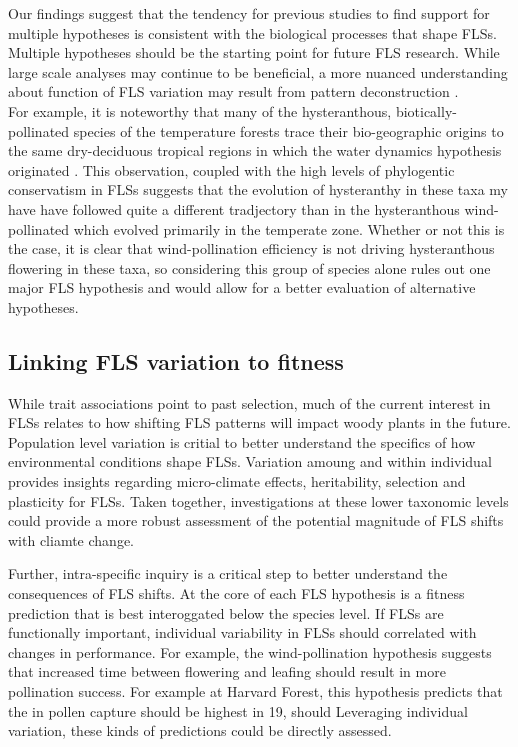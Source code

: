 \documentclass[11pt]{article}
\begin{document}
{\noindent Our findings suggest that the tendency for previous studies to find support for multiple hypotheses \citep{Bolmgren2003,Gougherty2018,Savage2019} is consistent with the biological processes that shape FLSs. Multiple hypotheses should be the starting point for future FLS research. While large scale analyses may continue to be beneficial, a more nuanced understanding about function of FLS variation may result from pattern deconstruction \citep[i.e. grouping of species according to trait commonalities or their geographic or phylogenetic distributions,][]{Terribile2009}.\\

\noindent For example, it is noteworthy that many of the hysteranthous, biotically-pollinated species of the temperature forests trace their bio-geographic origins to the same dry-deciduous tropical regions \citep{Daubenmire1972} in which the water dynamics hypothesis originated \citep{Janzen1967,Franklin2016}. This observation, coupled with the high levels of phylogentic conservatism in FLSs suggests that the evolution of hysteranthy in these taxa my have have followed quite a different tradjectory than in the hysteranthous wind-pollinated which evolved primarily in the temperate zone. Whether or not this is the case, it is clear that  wind-pollination efficiency is not driving hysteranthous flowering in these taxa, so considering this group of species alone rules out one major FLS hypothesis and would allow for a better evaluation of alternative hypotheses. 

\subsection*{Linking FLS variation to fitness}
\noindnent While trait associations point to past selection, much of the current interest in FLSs relates to how shifting FLS patterns will impact woody plants in the future. Population level variation is critial to better understand the specifics of how environmental conditions shape FLSs. Variation amoung and within individual provides insights regarding  micro-climate effects, heritability, selection and plasticity for FLSs. Taken together, investigations at these lower taxonomic levels could provide a more robust assessment of the potential magnitude of FLS shifts with cliamte change.

\noindent Further, intra-specific inquiry is a critical step to better understand the consequences of FLS shifts. At the core of each FLS hypothesis is a fitness prediction that is best interoggated below the species level. If FLSs are functionally important, individual variability in FLSs should correlated with changes in performance. For example, the wind-pollination hypothesis suggests that increased time between flowering and leafing should result in more pollination success. For example at Harvard Forest, this hypothesis predicts that the in pollen capture should be highest in 19, should  Leveraging individual variation, these kinds of predictions could be directly assessed.\\ 

}
\end{document}
